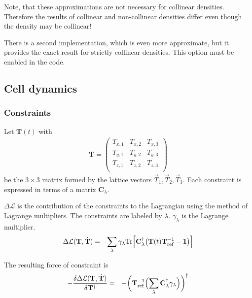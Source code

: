 \documentclass[final,12pt,makeidx,DIV=calc]{article}
\newcommand{\mat}[1]{\mathbf{#1}}
\newcommand{\Tr}{\mathrm{Tr}}      %
\begin{document}
{{{Note, that these approximations are not necessary for collinear
densities. Therefore the results of collinear and non-collinear
densities differ even though the density may be collinear!

There is a second implementation, which is even more approximate, but
it provides the exact result for strictly collinear densities. This
option must be enabled in the code.

\subsection{Cell dynamics}
\subsubsection{Constraints}
\label{sec:unitcellconstraints}
Let $\mat{T}(t)$ with
\begin{eqnarray}
\mat{T}=\left(\begin{array}{ccc}
T_{x,1} & T_{x,2} & T_{x,3}\\
T_{y,1} & T_{y,2} & T_{y,3}\\
T_{z,1} & T_{z,2} & T_{z,3}\\
\end{array}\right)
\end{eqnarray}
be the $3\times3$ matrix formed by the lattice vectors
$\vec{T}_1,\vec{T}_2,\vec{T}_3$.  Each constraint is expressed in
terms of a matrix $\mat{C}_\lambda$. 


$\Delta\mathcal{L}$ is the contribution of the constraints to the
Lagrangian using the method of Lagrange multipliers.  The constraints
are labeled by $\lambda$. $\gamma_\lambda$ is the Lagrange
multiplier.
\begin{eqnarray}
    \Delta\mathcal{L}(\mat{T},\dot{\mat{T}})
&=& \sum_\lambda \gamma_\lambda
         \Tr\Bigl[\mat{C}^\dagger_\lambda
                  \bigl(\mat{T}(t)\mat{T}^{-1}_{\text{ref}}-\mat{1}\bigr)
                  \Bigr]
\end{eqnarray}

The resulting force of constraint is
\begin{eqnarray}
-\frac{\delta\Delta\mathcal{L}(\mat{T},\dot{\mat{T}})}{\delta \mat{T}^\dagger}
&=& -\biggl(\mat{T}^{-1}_{\text{ref}}
\Bigl(\sum_\lambda \mat{C}^\dagger_\lambda \gamma_\lambda
                  \Bigr)\biggr)^\dagger
\end{eqnarray}

}}}
\end{document}
